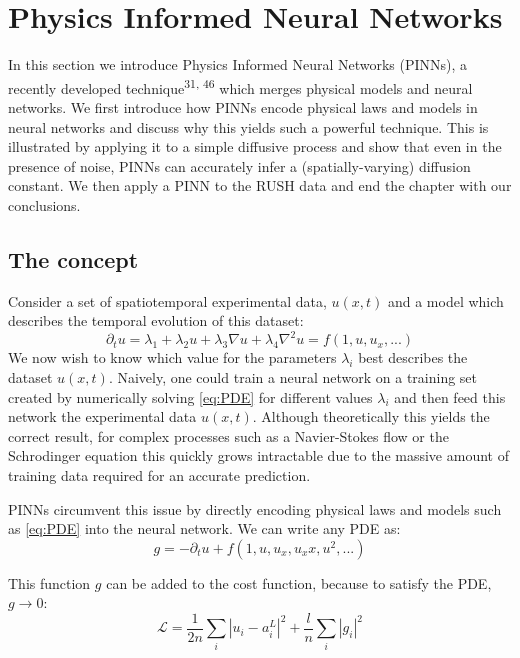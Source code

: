 \documentclass{Dissertate}
\begin{document}
\newpage

\hypertarget{physics-informed-neural-networks-1}{%
\section{Physics Informed Neural
Networks}\label{physics-informed-neural-networks-1}}

In this section we introduce Physics Informed Neural Networks (PINNs), a
recently developed technique\textsuperscript{31, 46}
which merges physical models and neural networks. We first introduce how
PINNs encode physical laws and models in neural networks and discuss why
this yields such a powerful technique. This is illustrated by applying
it to a simple diffusive process and show that even in the presence of
noise, PINNs can accurately infer a (spatially-varying) diffusion
constant. We then apply a PINN to the RUSH data and end the chapter with
our conclusions.

\hypertarget{the-concept-1}{%
\subsection{The concept}\label{the-concept-1}}

Consider a set of spatiotemporal experimental data, \(u(x,t)\) and a
model which describes the temporal evolution of this dataset:
\begin{equation}
\partial_t u = \lambda_1 + \lambda_2 u + \lambda_3\nabla u + \lambda_4 \nabla^2 u = f(1, u, u_x, ...)
\label{eq:PDE}\end{equation} We now wish to know which value for the
parameters \(\lambda_i\) best describes the dataset \(u(x,t)\). Naively,
one could train a neural network on a training set created by
numerically solving \ref{eq:PDE} for different values
\(\lambda_{i}\) and then feed this network the experimental data
\(u(x,t)\). Although theoretically this yields the correct result, for
complex processes such as a Navier-Stokes flow or the Schrodinger
equation this quickly grows intractable due to the massive amount of
training data required for an accurate prediction.

PINNs circumvent this issue by directly encoding physical laws and
models such as \ref{eq:PDE} into the neural network. We can write
any PDE as: \begin{equation}
g = -\partial_t u + f(1, u, u_x, u_xx, u^2, ...)
\label{eq:PIcost}\end{equation}

This function \(g\) can be added to the cost function, because to satisfy
the PDE, \(g \to 0\): \[
\mathcal{L} = \frac{1}{2n}\sum_i|u_i-a^L_i|^2 + \frac{l}{n}\sum_i|g_i|^2
\]
\end{document}
